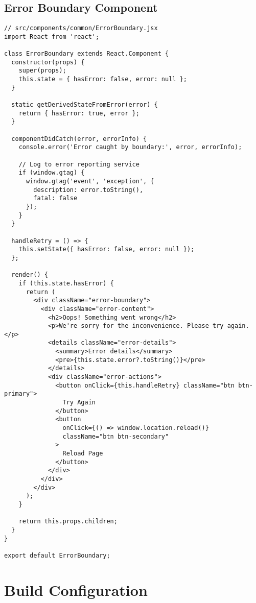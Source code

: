 \documentclass[12pt,a4paper]{article}
\begin{document}
\subsection{Error Boundary Component}
\begin{lstlisting}[caption=Error Boundary Implementation]
// src/components/common/ErrorBoundary.jsx
import React from 'react';

class ErrorBoundary extends React.Component {
  constructor(props) {
    super(props);
    this.state = { hasError: false, error: null };
  }

  static getDerivedStateFromError(error) {
    return { hasError: true, error };
  }

  componentDidCatch(error, errorInfo) {
    console.error('Error caught by boundary:', error, errorInfo);
    
    // Log to error reporting service
    if (window.gtag) {
      window.gtag('event', 'exception', {
        description: error.toString(),
        fatal: false
      });
    }
  }

  handleRetry = () => {
    this.setState({ hasError: false, error: null });
  };

  render() {
    if (this.state.hasError) {
      return (
        <div className="error-boundary">
          <div className="error-content">
            <h2>Oops! Something went wrong</h2>
            <p>We're sorry for the inconvenience. Please try again.</p>
            <details className="error-details">
              <summary>Error details</summary>
              <pre>{this.state.error?.toString()}</pre>
            </details>
            <div className="error-actions">
              <button onClick={this.handleRetry} className="btn btn-primary">
                Try Again
              </button>
              <button 
                onClick={() => window.location.reload()} 
                className="btn btn-secondary"
              >
                Reload Page
              </button>
            </div>
          </div>
        </div>
      );
    }

    return this.props.children;
  }
}

export default ErrorBoundary;
\end{lstlisting}

\section{Build Configuration}
\end{document}
